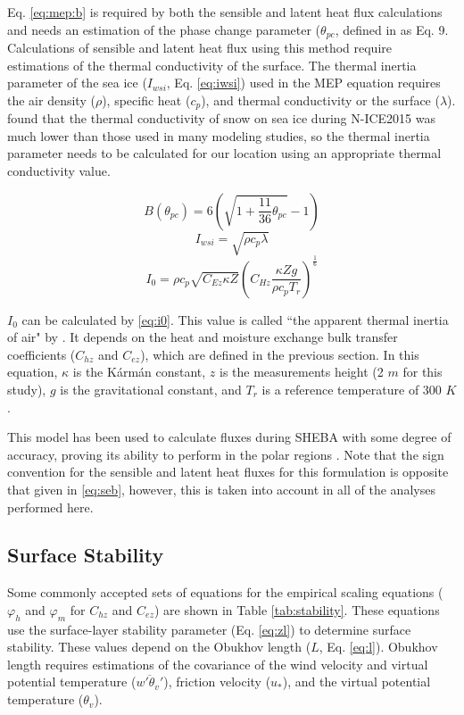 Eq. \ref{eq:mep:b} is required by both the sensible and latent heat flux calculations and needs an estimation of the phase change parameter ($\theta_{pc}$, defined in \citep{wang:2011} as Eq. 9. Calculations of sensible and latent heat flux using this method require estimations of the thermal conductivity \citep{wang:2014} of the surface. The thermal inertia parameter of the sea ice ($I_{wsi}$, Eq. \ref{eq:iwsi}) used in the MEP equation requires the air density ($\rho$), specific heat ($c_{p}$), and thermal conductivity or the surface ($\lambda$). \citet{merkouriadi:2017} found that the thermal conductivity of snow on sea ice during N-ICE2015 was much lower than those used in many modeling studies, so the thermal inertia parameter needs to be calculated for our location using an appropriate thermal conductivity value. 

\begin{equation}\label{eq:mep:b}
B(\theta_{pc}) = 6 \left( \sqrt{1 + \frac{11}{36} \theta_{pc}} - 1 \right)
\end{equation}
\begin{equation}\label{eq:iwsi}
I_{wsi} = \sqrt{\rho c_{p} \lambda}
\end{equation}
\begin{equation}\label{eq:i0}
I_{0} = \rho c_{p} \sqrt{C_{Ez}\kappa Z} \left( C_{Hz} \frac{\kappa Zg}{\rho c_{p} T_{r}} \right)^{\frac{1}{6}}
\end{equation}

$I_{0}$ can be calculated by \ref{eq:i0}. This value is called ``the apparent thermal inertia of air" by \citet{wang:2009}. It depends on the heat and moisture exchange bulk transfer coefficients ($C_{hz}$ and $C_{ez}$), which are defined in the previous section. In this equation, $\kappa$ is the K\'{a}rm\'{a}n constant, $z$ is the measurements height (2 $m$ for this study), $g$ is the gravitational constant, and $T_{r}$ is a reference temperature of 300 $K$. 

This model has been used to calculate fluxes during SHEBA with some degree of accuracy, proving its ability to perform in the polar regions \citep{wang:2014}. Note that the sign convention for the sensible and latent heat fluxes for this formulation is opposite that given in \ref{eq:seb}, however, this is taken into account in all of the analyses performed here.

\subsection{Surface Stability}
Some commonly accepted sets of equations for the empirical scaling equations ($\varphi_{h}$ and $\varphi_{m}$ for $C_{hz}$ and $C_{ez}$) are shown in Table \ref{tab:stability}. These equations use the surface-layer stability parameter (Eq. \ref{eq:zl}) to determine surface stability. These values depend on the Obukhov length ($L$, Eq. \ref{eq:l}). Obukhov length requires estimations of the covariance of the wind velocity and virtual potential temperature ($\overline{w'\theta_{v}'}$), friction velocity ($u_{*}$), and the virtual potential temperature ($\theta_{v}$). 

